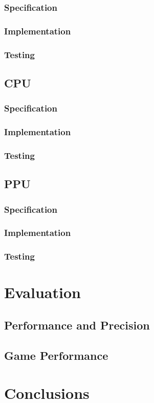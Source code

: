 \documentclass[]{report}
\begin{document}
\subsection{Specification}

\subsection{Implementation}

\subsection{Testing}

\section{CPU}

\subsection{Specification}

\subsection{Implementation}

\subsection{Testing}

\section{PPU}

\subsection{Specification}

\subsection{Implementation}

\subsection{Testing}

\chapter{Evaluation}

\section{Performance and Precision}

\section{Game Performance}

\chapter{Conclusions}

\printbibliography
\end{document}
